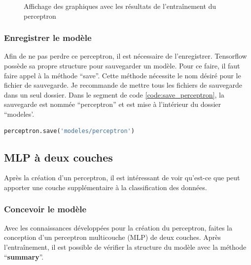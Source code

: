 \documentclass{article}
\begin{document}
\begin{figure}[H]
  \centering
  \caption{Affichage des graphiques avec les résultats de l'entraînement du perceptron}
  \label{fig:stats_figure}
\end{figure}

\subsubsection{Enregistrer le modèle}
Afin de ne pas perdre ce perceptron, il est nécessaire de l'enregistrer. Tensorflow possède sa propre structure pour sauvegarder un modèle. Pour ce faire, il faut faire appel à la méthode ``save''. Cette méthode nécessite le nom désiré pour le fichier de sauvegarde. Je recommande de mettre tous les fichiers de  sauvegarde dans un seul dossier. Dans le segment de code \ref{code:save_perceptron}, la sauvegarde est nommée ``perceptron'' et est mise à l'intérieur du dossier ``modeles'.
\medbreak
\begin{lstlisting}[language=Python, caption={Enregistrer le Perceptron}, label={code:save_perceptron}]
perceptron.save('modeles/perceptron')
\end{lstlisting}

\subsection{MLP à deux couches}
Après la création d'un perceptron, il est intéressant de voir qu'est-ce que peut apporter une couche supplémentaire à la classification des données.
\subsubsection{Concevoir le modèle}
Avec les connaissances développées pour la création du perceptron, faites la conception d'un perceptron multicouche (MLP) de deux couches. Après l'entraînement, il est possible de vérifier la structure du modèle avec la méthode ``\textbf{summary}''.
\medbreak
\end{document}
